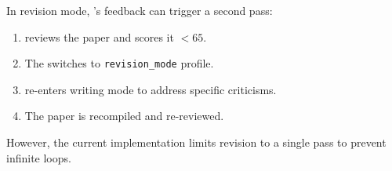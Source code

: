 In revision mode, \popper's feedback can trigger a second pass:
\begin{enumerate}
  \item \popper reviews the paper and scores it $<65$.
  \item The \governor switches to \texttt{revision\_mode} profile.
  \item \euler re-enters writing mode to address specific criticisms.
  \item The paper is recompiled and re-reviewed.
\end{enumerate}

However, the current implementation limits revision to a single pass to prevent infinite loops.
